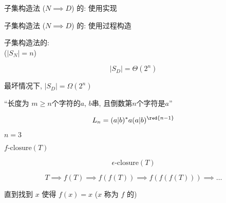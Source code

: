 \begin{frame}{}
  \begin{center}
    子集构造法 ($N \implies D$) 的:
    使用实现

  \end{center}
\end{frame}

\begin{frame}{}
  \begin{center}
    子集构造法 ($N \implies D$) 的:
    使用过程构造

  \end{center}
\end{frame}

\begin{frame}{}
  \begin{center}
    子集构造法的: \\
    ($|S_{N}| = n$)

    \[
      |S_{D}| = \Theta(2^n)
    \]

    \vspace{0.30cm}
    最坏情况下, $|S_{D}| = \Omega(2^n)$
  \end{center}
\end{frame}

\begin{frame}{}
  \begin{center}
    ``长度为 $m \ge n$个字符的$a$, $b$串, 且倒数第$n$个字符是$a$''

    \pause
    \[
      L_{n} = (a | b)^{\ast} a (a | b)^{\red{n-1}}
    \]

    \pause

    \pause
    \vspace{0.30cm}
     $n = 3$
  \end{center}
\end{frame}

\begin{frame}{}
  \begin{center}
     $f\text{-closure}(T)$

    \pause
    \[
      \epsilon\text{-closure}(T)
    \]

    \pause
    \[
      T \implies f(T) \implies f(f(T)) \implies f(f(f(T))) \implies \dots
    \]

    \pause
    直到找到 $x$ 使得 $f(x) = x$ ($x$ 称为 $f$ 的)
  \end{center}
\end{frame}

